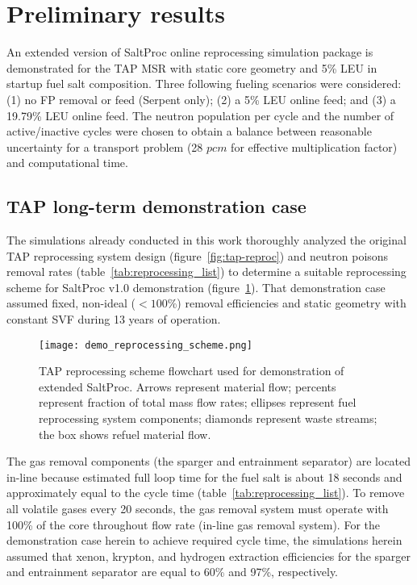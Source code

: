 \section{Preliminary results} \label{sec:stage2-demo}
An extended version of SaltProc online reprocessing simulation package is 
demonstrated for the \gls{TAP} \gls{MSR} with static core geometry and 5\% 
\gls{LEU} in startup fuel salt composition. Three following fueling
scenarios 
were considered: (1) no \gls{FP} removal or feed (Serpent only); (2) a 5\% 
\gls{LEU} online feed; and (3)
a 19.79\% \gls{LEU} online feed. 
The neutron population per cycle and the number of active/inactive cycles
were 
chosen to obtain a balance between reasonable uncertainty for a transport 
problem
(28 $pcm$ for effective multiplication factor) and computational time. 
\subsection{TAP long-term demonstration case} 
The simulations already conducted in this work thoroughly analyzed the 
original \gls{TAP} reprocessing system design (figure~\ref{fig:tap-reproc}) 
and neutron poisons removal rates  (table~\ref{tab:reprocessing_list}) to 
determine a suitable reprocessing scheme for SaltProc v1.0 demonstration 
(figure~\ref{fig:demo-repro-scheme}). That demonstration case assumed fixed, 
non-ideal ($<100$\%) removal efficiencies and static geometry with constant 
\gls{SVF} during 13 years of operation.
\begin{figure}[htp!] %
	\centering
	\texttt{[image: demo\_reprocessing\_scheme.png]}
	\caption{\gls{TAP} reprocessing scheme flowchart used for demonstration of 
	extended SaltProc. Arrows represent material flow; percents represent 
	fraction of total mass flow rates; ellipses represent fuel reprocessing 
		system components; diamonds represent waste streams; the box shows 
		refuel material flow.}
	\label{fig:demo-repro-scheme}
\end{figure}

The gas removal components (the sparger and entrainment separator) are located 
in-line because estimated full loop time for the fuel salt is about 18 seconds 
and approximately equal to the cycle time (table~\ref{tab:reprocessing_list}). 
To remove all volatile gases every 20 seconds, the gas removal system must 
operate with 100\% of the core throughout flow rate (in-line gas removal 
system). For the demonstration case herein to achieve required cycle time, the 
simulations herein assumed that xenon, krypton, and hydrogen extraction 
efficiencies for the sparger and entrainment separator are equal to 60\% and 
97\%, respectively.

